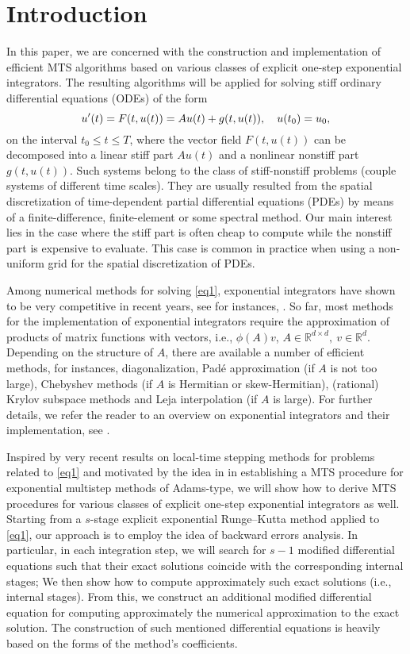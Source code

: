 \section{Introduction}
\label{sec1}
In this paper, we are concerned with the construction and implementation of efficient MTS algorithms based on various classes of  explicit one-step exponential integrators. The resulting algorithms will be applied for solving stiff ordinary differential equations (ODEs) of the form 
\begin{equation} \label{eq1}
u'(t)=F(t,u(t))=Au(t) + g(t,u(t)), \q  u(t_0)=u_0,
\end{equation}
on the interval $t_0\leq t \leq T$, where the vector field $F(t,u(t))$ can be decomposed into a linear stiff part $Au(t)$ and a nonlinear nonstiff part $g(t,u(t))$.
Such systems belong to the class of stiff-nonstiff problems (couple systems of different time scales). 
They are usually resulted from the spatial discretization of time-dependent partial differential equations (PDEs) by means of a finite-difference, finite-element or some spectral method. 
Our main interest lies in the case where the stiff part is often cheap to compute while the nonstiff part is expensive to evaluate. This case is common in practice when using a non-uniform grid for the spatial discretization of PDEs.

Among numerical methods for solving \eqref{eq1}, exponential integrators have shown to be very competitive in recent years, see for instances, \cite{HL97,HLS98,CM02,HO05a,HO05b,LO14a,LO14b}. 
So far, most methods for the implementation of exponential integrators require the approximation of products of matrix functions with vectors, i.e., $\phi (A)v$,  $A\in \mathbb{R}^{d\times d}, \ v\in \mathbb{R}^{d}$. Depending on the structure of $A$, there are available a number of efficient methods, 
for instances, diagonalization, Pad\'e approximation 
(if  $A$ is not too large), Chebyshev methods (if $A$ is Hermitian or skew-Hermitian), (rational) Krylov
subspace methods and Leja interpolation (if $A$ is large). For further details,  we refer the reader to  an overview on exponential integrators and their implementation, see \cite{HO10}. 

Inspired by very recent results \cite{Gander2012,Grote2010,Grote2013a,Grote2013b} on local-time stepping methods for problems related to \eqref{eq1} and  motivated by the idea in \cite[Sect. 5.3]{HO11} in establishing a MTS procedure for exponential multistep methods of Adams-type, we will show how to derive MTS procedures for various classes of explicit
one-step exponential integrators as well. Starting from a $s$-stage explicit exponential Runge--Kutta method applied to \eqref{eq1}, our approach is to employ the idea of backward errors analysis. In particular, in each integration step, we will search for $s-1$ modified differential equations such that their exact solutions coincide with the corresponding internal stages;  We then show how to compute approximately such exact solutions (i.e., internal stages). From this, we construct an additional modified differential equation for computing approximately the numerical approximation to the exact solution. The construction of such mentioned differential equations is heavily based on the forms of the method's coefficients.

